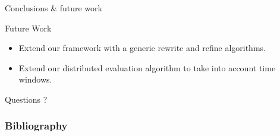 \documentclass[xcolor=pdftex,dvipsnames,table]{beamer}
\begin{document}

\begin{frame}{Conclusions \& future work}
  \begin{block}{Future Work}
   \begin{itemize}
     \item Extend our framework with a generic rewrite and refine algorithms.
     \pause
     \item Extend our distributed evaluation algorithm to take into account time windows.
   \end{itemize}
  \end{block}
\end{frame}


\begin{frame}[c]{ }
  \centering
  \huge Questions ?
\end{frame}


\begin{frame}[allowframebreaks]
  \frametitle{Bibliography}
  
  
\end{frame}
\end{document}
